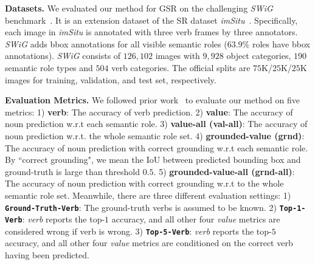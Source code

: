 \documentclass[letterpaper]{article} \usepackage{aaai22}  \usepackage{times}  \usepackage{helvet}  \usepackage{courier}  \usepackage[hyphens]{url}  \usepackage{graphicx} \urlstyle{rm} \def\UrlFont{\rm}  \usepackage{natbib}  \usepackage{caption} \DeclareCaptionStyle{ruled}{labelfont=normalfont,labelsep=colon,strut=off} \frenchspacing  \setlength{\pdfpagewidth}{8.5in}  \setlength{\pdfpageheight}{11in}
\begin{document}
\noindent \textbf{Datasets.}
We evaluated our method for GSR on the challenging \textit{SWiG} benchmark~\cite{pratt2020grounded}. It is an extension dataset of the SR dataset \textit{imSitu}~\cite{yatskar2016situation}. Specifically, each image in \textit{imSitu} is annotated with three verb frames by three annotators. \textit{SWiG} adds bbox annotations for all visible semantic roles ($63.9\%$ roles have bbox annotations). \textit{SWiG} consists of $126,102$ images with $9,928$ object categories, $190$ semantic role types and $504$ verb categories. The official splits are $75$K/$25$K/$25$K images for training, validation, and test set, respectively. 

\noindent \textbf{Evaluation Metrics.}
We followed prior work~\cite{pratt2020grounded} to evaluate our method on five metrics: 1) \textbf{verb}: The accuracy of verb prediction. 2) \textbf{value}: The accuracy of noun prediction w.r.t each semantic role. 3) \textbf{value-all (val-all)}: The accuracy of noun prediction w.r.t. the whole semantic role set. 4) \textbf{grounded-value (grnd)}: The accuracy of noun prediction with correct grounding w.r.t each semantic role. By ``correct grounding", we mean the IoU between predicted bounding box and ground-truth is large than threshold $0.5$. 5) \textbf{grounded-value-all (grnd-all)}: The accuracy of noun prediction with correct grounding w.r.t to the whole semantic role set. Meanwhile, there are three different evaluation settings: 1) \textbf{\texttt{Ground-Truth-Verb}}: The ground-truth verbs is assumed to be known. 2) \textbf{\texttt{Top-1-Verb}}: \emph{verb} reports the top-$1$ accuracy, and all other four \emph{value} metrics are considered wrong if verb is wrong. 3) \textbf{\texttt{Top-5-Verb}}: \emph{verb} reports the top-$5$ accuracy, and all other four \emph{value} metrics are conditioned on the correct verb having been predicted.
\end{document}
